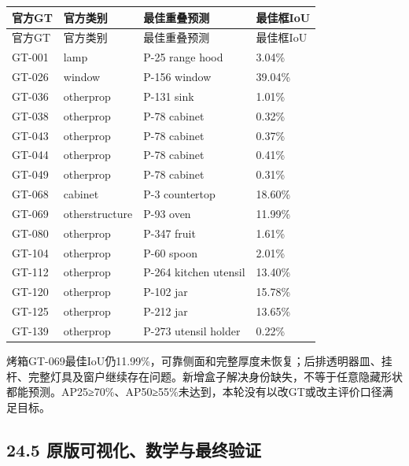 \documentclass[UTF8,fontset=fandol]{ctexart}
\begin{document}
{\small
\begin{longtable}{|p{}|p{}|p{}|p{}|}
\hline
官方GT & 官方类别 & 最佳重叠预测 & 最佳框IoU \\ \hline
\endfirsthead
\hline
官方GT & 官方类别 & 最佳重叠预测 & 最佳框IoU \\ \hline
\endhead
GT-001 & lamp & P-25 range hood & 3.04\% \\ \hline
GT-026 & window & P-156 window & 39.04\% \\ \hline
GT-036 & otherprop & P-131 sink & 1.01\% \\ \hline
GT-038 & otherprop & P-78 cabinet & 0.32\% \\ \hline
GT-043 & otherprop & P-78 cabinet & 0.37\% \\ \hline
GT-044 & otherprop & P-78 cabinet & 0.41\% \\ \hline
GT-049 & otherprop & P-78 cabinet & 0.31\% \\ \hline
GT-068 & cabinet & P-3 countertop & 18.60\% \\ \hline
GT-069 & otherstructure & P-93 oven & 11.99\% \\ \hline
GT-080 & otherprop & P-347 fruit & 1.61\% \\ \hline
GT-104 & otherprop & P-60 spoon & 2.01\% \\ \hline
GT-112 & otherprop & P-264 kitchen utensil & 13.40\% \\ \hline
GT-120 & otherprop & P-102 jar & 15.78\% \\ \hline
GT-125 & otherprop & P-212 jar & 13.65\% \\ \hline
GT-139 & otherprop & P-273 utensil holder & 0.22\% \\ \hline
\end{longtable}
}

烤箱GT-069最佳IoU仍11.99\%，可靠侧面和完整厚度未恢复；后排透明器皿、挂杆、完整灯具及窗户继续存在问题。新增盒子解决身份缺失，不等于任意隐藏形状都能预测。AP25≥70\%、AP50≥55\%未达到，本轮没有以改GT或改主评价口径满足目标。



\subsection*{24.5 原版可视化、数学与最终验证}
\end{document}
